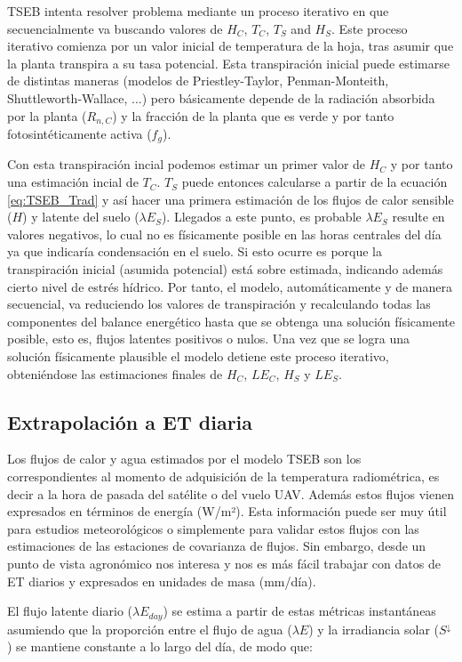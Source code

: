 \documentclass[a4paper,11pt]{article}
\begin{document}
  TSEB intenta resolver problema mediante un proceso iterativo en que secuencialmente va buscando valores de $H_C$, $T_C$, $T_S$ and $H_S$. Este proceso iterativo comienza por un valor inicial de temperatura de la hoja, tras asumir que la planta transpira a su tasa potencial. Esta transpiración inicial puede estimarse de distintas maneras (modelos de Priestley-Taylor, Penman-Monteith, Shuttleworth-Wallace, ...) pero básicamente depende de la radiación absorbida por la planta ($R_{n,C}$) y la fracción de la planta que es verde y por tanto fotosintéticamente activa ($f_g$).
  
  Con esta transpiración incial podemos estimar un primer valor de $H_C$ y por tanto una estimación incial de $T_{C}$. $T_{S}$ puede entonces calcularse a partir de la ecuación \ref{eq:TSEB_Trad} y así hacer una primera estimación de los flujos de calor sensible ($H$) y latente del suelo ($\lambda E_S$). Llegados a este punto, es probable $\lambda E_S$ resulte en valores negativos, lo cual no es físicamente posible en las horas centrales del día ya que indicaría condensación en el suelo. Si esto ocurre es porque la transpiración inicial (asumida potencial) está sobre estimada, indicando además cierto nivel de estrés hídrico. Por tanto, el modelo, automáticamente y de manera secuencial, va reduciendo los valores de transpiración y recalculando todas las componentes del balance energético hasta que se obtenga una solución físicamente posible, esto es, flujos latentes positivos o nulos. Una vez que se logra una solución físicamente plausible el modelo detiene este proceso iterativo, obteniéndose las estimaciones finales de $H_C$, $LE_C$, $H_S$ y $LE_S$.
  
  \subsection{Extrapolación a ET diaria}
   Los flujos de calor y agua estimados por el modelo TSEB son los correspondientes al momento de adquisición de la temperatura radiométrica, es decir a la hora de pasada del satélite o del vuelo UAV. Además estos flujos vienen expresados en términos de energía (W/m²). Esta información puede ser muy útil para estudios meteorológicos o simplemente para validar estos flujos con las estimaciones de las estaciones de covarianza de flujos. Sin embargo, desde un punto de vista agronómico nos interesa y nos es más fácil trabajar con datos de ET diarios y expresados en unidades de masa (mm/día). 
   
   El flujo latente diario ($\lambda E_{day}$) se estima a partir de estas métricas instantáneas asumiendo que la proporción entre el flujo de agua ($\lambda E$) y la irradiancia solar ($S^\downarrow$) se mantiene constante a lo largo del día, de modo que:
    
\end{document}
